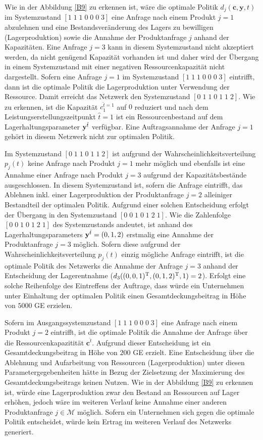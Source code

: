 Wie in der Abbildung \ref{B9} zu erkennen ist, wäre die optimale Politik $d_{j}({\textbf{c},\textbf{y}, t})$ im Systemzustand $[1\;1\;1\;0\;0\;0\;3]$ eine Anfrage nach einem Produkt $j=1$ abzulehnen und eine Bestandsveränderung des Lagers zu bewilligen (Lagerproduktion) sowie die Annahme der Produktanfrage $j$ anhand der Kapazitäten. Eine Anfrage $j=3$ kann in diesem Systemzustand nicht akzeptiert werden, da nicht genügend Kapazität vorhanden ist und daher wird der Übergang in einem Systemzustand mit einer negativen Ressourcenkapazität nicht dargestellt. Sofern eine Anfrage $j=1$ im Systemzustand $[1\;1\;1\;0\;0\;0\;3]$ eintrifft, dann ist die optimale Politik die Lagerproduktion unter Verwendung der Ressource. Damit erreicht das Netzwerk den Systemzustand $[0\;1\;1\;0\;1\;1\;2]$. Wie zu erkennen, ist die Kapazität $c_1^{\hat t=1}$ auf $0$ reduziert und nach dem Leistungserstellungszeitpunkt $\hat t = 1$ ist ein Ressourcenbestand auf dem Lagerhaltungsparameter $\textbf y^{\hat t}$ verfügbar. Eine Auftragsannahme der Anfrage $j=1$ gehört in diesem Netzwerk nicht zur optimalen Politik.

Im Systemzustand $[0\;1\;1\;0\;1\;1\;2]$ ist aufgrund der Wahrscheinlichkeitsverteilung $p_j(t)$ keine Anfrage nach Produkt $j=1$ mehr möglich und ebenfalls ist eine Annahme einer Anfrage nach Produkt $j=3$ aufgrund der Kapazitätsbestände ausgeschlossen. In diesem Systemzustand ist, sofern die Anfrage eintrifft, das Ablehnen inkl. einer Lagerproduktion der Produktanfrage $j=2$ alleiniger Bestandteil der optimalen Politik. Aufgrund einer solchen Entscheidung erfolgt der Übergang in den Systemzustand $[0\;0\;1\;0\;1\;2\;1]$. Wie die Zahlenfolge $[0\;0\;1\;0\;1\;2\;1]$ des Systemzustands andeutet, ist anhand des Lagerhaltungsparameters $\textbf y^{\hat t}=(0,1,2)$ erstmalig eine Annahme der Produktanfrage $j=3$ möglich. Sofern diese aufgrund der Wahrscheinlichkeitsverteilung $p_j(t)$ einzig mögliche Anfrage eintrifft, ist die optimale Politik des Netzwerks die Annahme der Anfrage $j=3$ anhand der Entscheidung der Lagerentnahme ($d_{3}((0,0,1)^{\textnormal T},(0,1,2)^{\textnormal T}, 1)=2$). Erfolgt eine solche Reihenfolge des Eintreffens der Auftrage, dass würde ein Unternehmen unter Einhaltung der optimalen Politik einen Gesamtdeckungsbeitrag in Höhe von $5000$ GE erzielen.

Sofern im Ausgangssystemzustand $[1\;1\;1\;0\;0\;0\;3]$ eine Anfrage nach einem Produkt $j=2$ eintrifft, ist die optimale Politik die Annahme der Anfrage über die Ressourcenkapazitität $\textbf{c}^{\hat t}$. Aufgrund dieser Entscheidung ist ein Gesamtdeckungsbeitrag in Höhe von $200$ GE erzielt. Eine Entscheidung über die Ablehnung und Aufarbeitung von Ressourcen (Lagerproduktion) unter diesen Parametergegebenheiten hätte in Bezug der Zielsetzung der Maximierung des Gesamtdeckungsbeitrags keinen Nutzen. Wie in der Abbildung \ref{B9} zu erkennen ist, würde eine Lagerproduktion zwar den Bestand an Ressourcen auf Lager erhöhen, jedoch wäre im weiteren Verlauf keine Annahme einer anderen Produktanfrage $j\in\mathcal M$ möglich. Sofern ein Unternehmen sich gegen die optimale Politik entscheidet, würde kein Ertrag im weiteren Verlauf des Netzwerks generiert.

